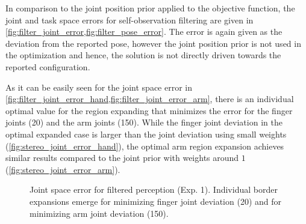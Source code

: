 In comparison to the joint position prior applied to the objective function, the joint and task space errors for self-observation filtering are given in \cref{fig:filter_joint_error,fig:filter_pose_error}. The error is again given as the deviation from the reported pose, however the joint position prior is not used in the optimization and hence, the solution is not directly driven towards the reported configuration.

As it can be easily seen for the joint space error in \cref{fig:filter_joint_error_hand,fig:filter_joint_error_arm}, there is an individual optimal value for the region expanding that minimizes the error for the finger joints (20) and the arm joints (150). While the finger joint deviation in the optimal expanded case is larger than the joint deviation using small weights (\cref{fig:stereo_joint_error_hand}), the optimal arm region expansion achieves similar results compared to the joint prior with weights around $1$ (\cref{fig:stereo_joint_error_arm}).

\begin{figure}[h]
\centering
{}
\caption[Joint space error for filtered perception (Exp. 1)]{Joint space error for filtered perception (Exp. 1). Individual border expansions emerge for minimizing finger joint deviation (20) and for minimizing arm joint deviation (150).}
\label{fig:filter_joint_error}
\end{figure}

